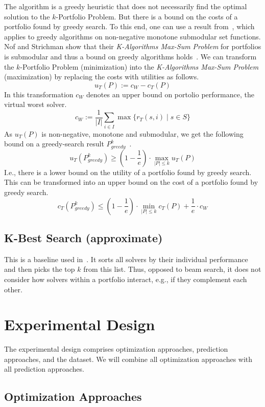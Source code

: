 \documentclass[conference]{IEEEtran}
\begin{document}
The algorithm is a greedy heuristic that does not necessarily find the optimal solution to the $k$-Portfolio Problem. 
But there is a bound on the costs of a portfolio found by greedy search. 
To this end, one can use a result from~\cite{nemhauser1978analysis}, which applies to greedy algorithms on non-negative monotone submodular set functions.
Nof and Strichman show that their \emph{K-Algorithms Max-Sum Problem} for portfolios is submodular and thus a bound on greedy algorithms holds~\cite{nof2020real}. 
We can transform the $k$-Portfolio Problem (minimization) into the \emph{K-Algorithms Max-Sum Problem} (maximization) by replacing the costs with utilities as follows.%
$$
u_{T}(P) := c_W - c_{T}(P)
$$
In this transformation $c_W$ denotes an upper bound on portolio performance, the virtual worst solver.%
$$
c_W := \frac{1}{|I|} \sum_{i \in I}{\max\{{r_T(s,i) \mid s \in S}}\}
$$
As $u_{T}(P)$ is non-negative, monotone and submodular, we get the following bound on a greedy-search result $P_{greedy}^k$~\cite{nemhauser1978analysis, krause2014submodular}.%
$$
	u_{T}(P_{greedy}^k) \geq (1 - \frac{1}{e}) \cdot \max_{|P| \leq k}{u_{T}(P)}
$$
I.e., there is a lower bound on the utility of a portfolio found by greedy search.
This can be transformed into an upper bound on the cost of a portfolio found by greedy search.%
$$
	c_{T}(P_{greedy}^k) \leq (1 - \frac{1}{e}) \cdot \min_{|P| \leq k}{c_{T}(P)} + \frac{1}{e} \cdot c_W
$$

\subsection{K-Best Search (approximate)}

This is a baseline used in~\cite{nof2020real}.
It sorts all solvers by their individual performance and then picks the top $k$ from this list.
Thus, opposed to beam search, it does not consider how solvers within a portfolio interact, e.g., if they complement each other.


\section{Experimental Design}
\label{sec:experimental-design}

The experimental design comprises optimization approaches, prediction approaches, and the dataset.
We will combine all optimization approaches with all prediction approaches.

\subsection{Optimization Approaches}
\end{document}
